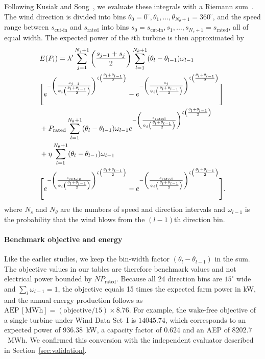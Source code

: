 \documentclass[journal,twoside]{IEEEtran}
\begin{document}
Following Kusiak and Song~\cite{Kusiak2010}, we evaluate these integrals with a Riemann sum~\cite{Stroock1999}. The wind direction is divided into bins $\theta_0 = 0^\circ, \theta_1, \ldots, \theta_{N_\theta+1} = 360^\circ$, and the speed range between $s_{\text{cut-in}}$ and $s_{\text{rated}}$ into bins $s_0 = s_{\text{cut-in}}, s_1, \ldots, s_{N_s+1} = s_{\text{rated}}$, all of equal width. The expected power of the $i$th turbine is then approximated by
{\small
\begin{align*}
&E(P_i) = \lambda' \sum_{j=1}^{N_s+1} \left(\frac{s_{j-1} + s_j}{2}\right) \sum_{l=1}^{N_\theta+1} (\theta_l - \theta_{l-1}) \omega_{l-1}  \notag \\
&\Bigg[ e^{-\left(\frac{s_{j-1}}{\psi_i\left(\frac{\theta_l + \theta_{l-1}}{2}\right)}\right)^{\zeta\left(\frac{\theta_l + \theta_{l-1}}{2}\right)}}- e^{-\left(\frac{s_j}{\psi_i\left(\frac{\theta_l + \theta_{l-1}}{2}\right)}\right)^{\zeta\left(\frac{\theta_l + \theta_{l-1}}{2}\right)}} \Bigg]  \notag \\
&+P_{\text{rated}} \sum_{l=1}^{N_\theta+1} (\theta_l - \theta_{l-1}) \omega_{l-1} e^{-\left(\frac{s_{\text{rated}}}{\psi_i\left(\frac{\theta_l + \theta_{l-1}}{2}\right)}\right)^{\zeta\left(\frac{\theta_l + \theta_{l-1}}{2}\right)}} \\
& + \eta \sum_{l=1}^{N_\theta+1} (\theta_l - \theta_{l-1}) \omega_{l-1} \\
&\Bigg[ e^{-\left(\frac{s_{\text{cut-in}}}{\psi_i\left(\frac{\theta_l + \theta_{l-1}}{2}\right)}\right)^{\zeta\left(\frac{\theta_l + \theta_{l-1}}{2}\right)}} - e^{-\left(\frac{s_{\text{rated}}}{\psi_i\left(\frac{\theta_l + \theta_{l-1}}{2}\right)}\right)^{\zeta\left(\frac{\theta_l + \theta_{l-1}}{2}\right)}} \Bigg].
\end{align*}
}
where $N_s$ and $N_\theta$ are the numbers of speed and direction intervals and $\omega_{l-1}$ is the probability that the wind blows from the $(l-1)$th direction bin.

\paragraph{Benchmark objective and energy}
Like the earlier studies, we keep the bin-width factor $(\theta_l-\theta_{l-1})$ in the sum. The objective values in our tables are therefore benchmark values and not electrical power bounded by $N P_{\text{rated}}$. Because all 24 direction bins are $15^\circ$ wide and $\sum_l\omega_{l-1}=1$, the objective equals 15 times the expected farm power in kW, and the annual energy production follows as $\mathrm{AEP}\,[\mathrm{MWh}] = (\text{objective}/15)\times 8.76$. For example, the wake-free objective of a single turbine under Wind Data Set~I is $14045.74$, which corresponds to an expected power of $936.38$~kW, a capacity factor of $0.624$ and an AEP of $8202.7$~MWh. We confirmed this conversion with the independent evaluator described in Section~\ref{sec:validation}.
\end{document}
